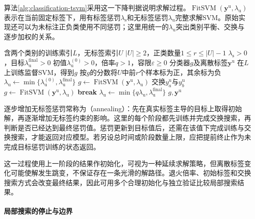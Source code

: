 算法\ref{alg:classification-tsvm}采用这一下降判据说明求解过程。$\operatorname{FitSVM}(\bm{y}^{\mathrm{u}},\lambda_{\mathrm{u}})$表示在当前固定标签下，用有标签惩罚$\lambda_{\mathrm{s}}$和无标签惩罚$\lambda_{\mathrm{u}}$完整求解SVM。原始实现还可以为未标注正负类使用不同惩罚；这里用统一的$\lambda_{\mathrm{u}}$突出类别平衡、交换与逐步加权的关系。

\begin{algorithm}[固定类别数量的TSVM逐步加权]
  \label{alg:classification-tsvm}
  \begin{algorithmic}[1]
    \Require 含两个类别的训练索引$L$，无标签索引$U$
    \Require $|U|\geq2$，正类数量$1\leq r\leq|U|-1$
    \Require $\lambda_{\mathrm{s}}>0$，目标$\lambda_{\mathrm{u}}^{\mathrm{final}}>0$
    \Require 初值$\lambda_{\mathrm{u}}^{(0)}>0$，倍率$q>1$，容限$\varepsilon\geq0$
    \Ensure 分类器$g$及离散标签$\bm{y}^{\mathrm{u}}$
    \State 在$L$上训练监督SVM，得到$g$
    \State 按$g$的分数将$U$中前$r$个样本标为正，其余标为负
    \State $\lambda_{\mathrm{u}}\gets
      \min\{\lambda_{\mathrm{u}}^{(0)},\lambda_{\mathrm{u}}^{\mathrm{final}}\}$
      \State $g\gets\operatorname{FitSVM}(\bm{y}^{\mathrm{u}},\lambda_{\mathrm{u}})$
        \State 交换$y_a^{\mathrm{u}}$与$y_b^{\mathrm{u}}$
        \State $g\gets\operatorname{FitSVM}(\bm{y}^{\mathrm{u}},\lambda_{\mathrm{u}})$
      \EndWhile
        \State \textbf{break}
      \EndIf
      \State $\lambda_{\mathrm{u}}\gets
        \min\{q\lambda_{\mathrm{u}},\lambda_{\mathrm{u}}^{\mathrm{final}}\}$
    \EndWhile
    \State \Return $g,\bm{y}^{\mathrm{u}}$
  \end{algorithmic}
\end{algorithm}

逐步增加无标签惩罚常称为（annealing）：先在真实标签主导的目标上取得初始解，再逐渐增加无标签约束的影响。这里的每个阶段都先训练并完成交换搜索，再判断是否已经达到最终惩罚值。惩罚更新到目标值后，还需在该值下完成训练与交换搜索，才能返回对应模型。若另设总时间或阶段数量上限，应把提前终止作为未完成目标惩罚训练的状态返回。

这一过程使用上一阶段的结果作初始化，可视为一种延续求解策略，但离散标签变化可能使解发生跳变，不保证存在一条光滑的解路径。退火倍率、初始标签和交换搜索方式会改变最终结果，因此可用多个合理初始化与独立验证比较局部搜索结果。

\paragraph{局部搜索的停止与边界}
\label{sec:classification-tsvm-analysis}


